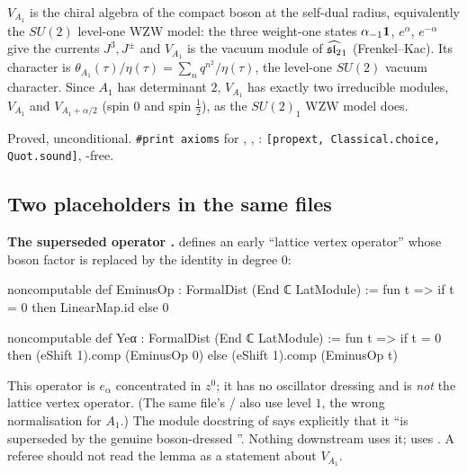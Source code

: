 \begin{physics}
$V_{A_1}$ is the chiral algebra of the compact boson at the self-dual radius, equivalently the $SU(2)$ level-one
WZW model: the three weight-one states $\alpha_{-1}\mathbf{1}$, $e^{\alpha}$, $e^{-\alpha}$ give the currents $J^3,J^\pm$ and
$V_{A_1}$ is the vacuum module of $\widehat{\mathfrak{sl}_2}_1$ (Frenkel--Kac). Its character is
$\theta_{A_1}(\tau)/\eta(\tau)=\sum_nq^{n^2}/\eta(\tau)$, the level-one $SU(2)$ vacuum character. Since $A_1$ has
determinant $2$, $V_{A_1}$ has exactly two irreducible modules, $V_{A_1}$ and $V_{A_1+\alpha/2}$ (spin $0$ and spin
$\frac12$), as the $SU(2)_1$ WZW model does.
\end{physics}

\begin{status}
Proved, unconditional. \texttt{\#print axioms} for , ,
: \texttt{[propext, Classical.choice, Quot.sound]}, -free.
\end{status}

\subsection{Two placeholders in the same files}

\begin{warning}
\textbf{The superseded operator .} 
defines an early ``lattice vertex operator'' whose boson factor is replaced by the identity in degree $0$:
\begin{leancode}
noncomputable def EminusOp : FormalDist (End ℂ LatModule) :=
  fun t => if t = 0 then LinearMap.id else 0

noncomputable def Yeα : FormalDist (End ℂ LatModule) :=
  fun t => if t = 0 then (eShift 1).comp (EminusOp 0) else (eShift 1).comp (EminusOp t)
\end{leancode}
This operator is $e_\alpha$ concentrated in $z^0$; it has no oscillator dressing and is \emph{not} the lattice vertex
operator. (The same file's / also use level $1$, the wrong normalisation for $A_1$.) The
module docstring of  says explicitly that it ``is superseded by the genuine boson-dressed
''. Nothing downstream uses it;  uses . A referee should not
read the lemma  as a statement about $V_{A_1}$.
\end{warning}

